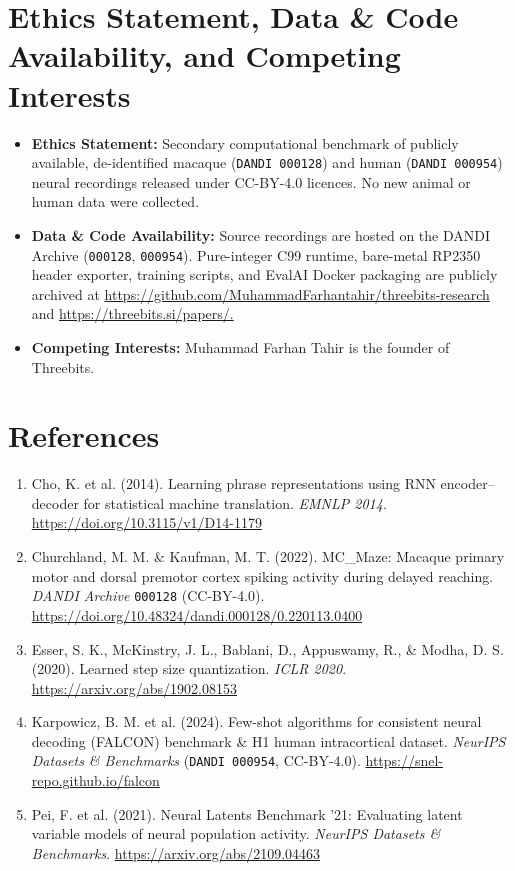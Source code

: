 \documentclass[11pt,a4paper]{article}
\begin{document}
\section*{Ethics Statement, Data \& Code Availability, and Competing Interests}
\begin{itemize}
\item \textbf{Ethics Statement:} Secondary computational benchmark of publicly available, de-identified macaque (\texttt{DANDI 000128}) and human (\texttt{DANDI 000954}) neural recordings released under CC-BY-4.0 licences. No new animal or human data were collected.
\item \textbf{Data \& Code Availability:} Source recordings are hosted on the DANDI Archive (\texttt{000128}, \texttt{000954}). Pure-integer C99 runtime, bare-metal RP2350 header exporter, training scripts, and EvalAI Docker packaging are publicly archived at \url{https://github.com/MuhammadFarhantahir/threebits-research} and \url{https://threebits.si/papers/.}
\item \textbf{Competing Interests:} Muhammad Farhan Tahir is the founder of Threebits.
\end{itemize}
\section*{References}
\begin{enumerate}
\item Cho, K. et al. (2014). Learning phrase representations using RNN encoder--decoder for statistical machine translation. \emph{EMNLP 2014}. \url{https://doi.org/10.3115/v1/D14-1179}
\item Churchland, M. M. \& Kaufman, M. T. (2022). MC\_Maze: Macaque primary motor and dorsal premotor cortex spiking activity during delayed reaching. \emph{DANDI Archive} \texttt{000128} (CC-BY-4.0). \url{https://doi.org/10.48324/dandi.000128/0.220113.0400}
\item Esser, S. K., McKinstry, J. L., Bablani, D., Appuswamy, R., \& Modha, D. S. (2020). Learned step size quantization. \emph{ICLR 2020}. \url{https://arxiv.org/abs/1902.08153}
\item Karpowicz, B. M. et al. (2024). Few-shot algorithms for consistent neural decoding (FALCON) benchmark \& H1 human intracortical dataset. \emph{NeurIPS Datasets \& Benchmarks} (\texttt{DANDI 000954}, CC-BY-4.0). \url{https://snel-repo.github.io/falcon}
\item Pei, F. et al. (2021). Neural Latents Benchmark '21: Evaluating latent variable models of neural population activity. \emph{NeurIPS Datasets \& Benchmarks}. \url{https://arxiv.org/abs/2109.04463}
\end{enumerate}
\end{document}
